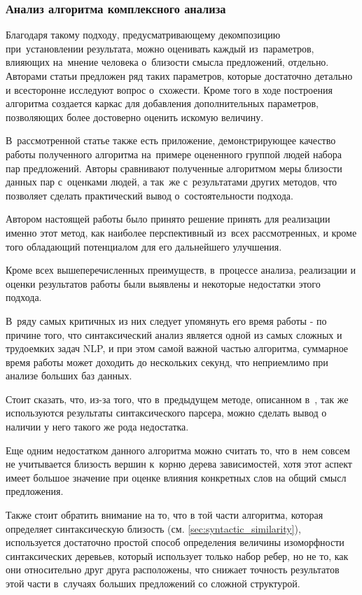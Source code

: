 \subsubsection{Анализ алгоритма комплексного анализа}
\label{sec:complex_algorithm_analysis}
Благодаря такому подходу, предусматривающему декомпозицию при~установлении результата, 
можно оценивать каждый из~параметров, влияющих на~мнение человека о~близости смысла предложений, отдельно. 
Авторами статьи предложен ряд таких параметров, 
которые достаточно детально и всесторонне исследуют вопрос о~схожести. Кроме того
в ходе построения алгоритма создается каркас для добавления дополнительных параметров,
позволяющих более достоверно оценить искомую величину. 

В~рассмотренной статье\cite{complexSim} также есть приложение, демонстрирующее качество работы
полученного алгоритма на~примере оцененного группой людей набора пар предложений.
Авторы сравнивают полученные алгоритмом меры близости данных пар с~оценками людей, 
а так~же с~результатами других методов, что позволяет сделать практический вывод
о~состоятельности подхода.

Автором настоящей работы было принято решение принять для реализации именно этот метод,
как наиболее перспективный из~всех рассмотренных, и кроме того обладающий
потенциалом для его дальнейшего улучшения.

Кроме всех вышеперечисленных преимуществ, в~процессе анализа, 
реализации и оценки результатов работы были выявлены
и некоторые недостатки этого подхода.

В~ряду самых критичных из них следует упомянуть его время работы - 
по причине того, что синтаксический анализ является одной из самых
сложных и трудоемких задач NLP, и при этом самой важной частью алгоритма,
суммарное время работы может доходить до нескольких секунд,
что неприемлимо при анализе больших баз данных.

Стоит сказать, что, из-за того, что в~предыдущем методе, описанном в~\cite{weightedDep},
так же используются результаты синтаксического парсера, можно сделать вывод
о наличии у него такого же рода недостатка.

Еще одним недостатком данного алгоритма можно считать то, что в~нем совсем
не учитывается близость вершин к~корню дерева зависимостей, хотя этот аспект
имеет большое значение при оценке влияния конкретных слов на общий смысл
предложения.

Также стоит обратить внимание на то, что в той части алгоритма, 
которая определяет синтаксическую близость (см. \ref{sec:syntactic_similarity}),
используется достаточно простой способ определения величины изоморфности
синтаксических деревьев, который использует только набор ребер, но не то,
как они относительно друг друга расположены, что снижает точность
результатов этой части в~случаях больших предложений со сложной структурой.

